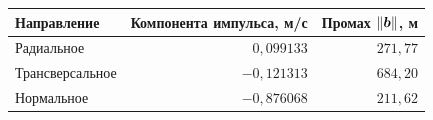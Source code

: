 \begin{tabular}{@{}lrr@{}}\toprule
Направление&Компонента импульса, м/с&Промах $\left\lVert\boldsymbol{b}\right\rVert$, м\\\midrule
Радиальное&$0{,}099133$&$271{,}77$\\
Трансверсальное&$-0{,}121313$&$684{,}20$\\
Нормальное&$-0{,}876068$&$211{,}62$\\
\bottomrule\end{tabular}
